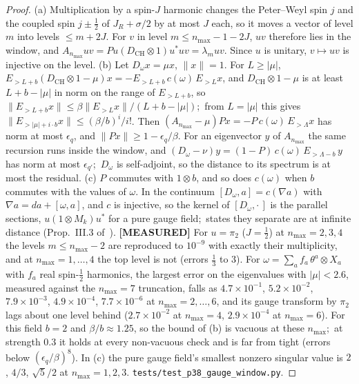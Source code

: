 \documentclass[11pt,a4paper]{article}
\theoremstyle{plain}
\theoremstyle{definition}
\newcommand{\nmax}{n_{\max}}
\newcommand{\norm}[1]{\lVert #1 \rVert}
\newcommand{\DCH}{D_{\mathrm{CH}}}
\begin{document}
\begin{proof}
(a) Multiplication by a spin-$J$ harmonic changes the Peter--Weyl spin
$j$ and the coupled spin $j \pm \tfrac12$ of $J_R + \sigma/2$ by at most
$J$ each, so it moves a vector of level $m$ into levels $\le m + 2J$.
For $v$ in level $m \le \nmax - 1 - 2J$, $uv$ therefore lies in the
window, and $A_{\nmax} uv = P u (\DCH \otimes 1) u^* u v = \lambda_m
uv$. Since $u$ is unitary, $v \mapsto uv$ is injective on the level.
(b) Let $D_\omega x = \mu x$, $\norm{x} = 1$. For $L \ge |\mu|$,
$E_{>L+b}(\DCH \otimes 1 - \mu) x = -E_{>L+b}\, c(\omega)\, E_{>L} x$,
and $\DCH \otimes 1 - \mu$ is at least $L + b - |\mu|$ in norm on the
range of $E_{>L+b}$, so $\norm{E_{>L+b} x} \le \beta \norm{E_{>L} x}/
(L + b - |\mu|)$;\ from $L = |\mu|$ this gives $\norm{E_{>|\mu| + i \cdot b}
x} \le (\beta/b)^i/i!$. Then $(A_{\nmax} - \mu) P x = -P\, c(\omega)\,
E_{>\Lambda} x$ has norm at most $\epsilon_q$, and $\norm{Px} \ge 1 -
\epsilon_q/\beta$. For an eigenvector $y$ of $A_{\nmax}$ the same
recursion runs inside the window, and $(D_\omega - \nu) y = (1 - P)\,
c(\omega)\, E_{>\Lambda - b}\, y$ has norm at most $\epsilon_{q'}$;\
$D_\omega$ is self-adjoint, so the distance to its spectrum is at most
the residual. (c) $P$ commutes with $1 \otimes b$, and so does
$c(\omega)$ when $b$ commutes with the values of $\omega$. In the
continuum $[D_\omega, a] = c(\nabla a)$ with $\nabla a = da + [\omega,
a]$, and $c$ is injective, so the kernel of $[D_\omega, \cdot\,]$ is the
parallel sections, $u (1 \otimes M_k) u^*$ for a pure gauge field;\
states they separate are at infinite distance (Prop.~III.3
of~\cite{martinetti2006}). \textbf{[MEASURED]} For $u = \pi_2$ ($J = \tfrac12$)
at $\nmax = 2, 3, 4$ the levels $m \le \nmax - 2$ are reproduced to
$10^{-9}$ with exactly their multiplicity, and at $\nmax = 1, \dots, 4$
the top level is not (errors $\tfrac13$ to $3$). For $\omega = \sum_a f_a\, \theta^a \otimes
X_a$ with $f_a$ real spin-$\tfrac12$ harmonics, the largest error on
the eigenvalues with $|\mu| < 2.6$, measured against the $\nmax = 7$
truncation, falls as $4.7 \times 10^{-1}$,
$5.2 \times 10^{-2}$, $7.9 \times 10^{-3}$, $4.9 \times 10^{-4}$, $7.7
\times 10^{-6}$ at $\nmax = 2, \dots, 6$, and its gauge transform by
$\pi_2$ lags about one level behind ($2.7 \times 10^{-2}$ at $\nmax =
4$, $2.9 \times 10^{-4}$ at $\nmax = 6$). For this field $b = 2$ and
$\beta/b \approx 1.25$, so the bound of (b) is vacuous at these
$\nmax$;\ at strength $0.3$ it holds at every non-vacuous check and is
far from tight (errors below $(\epsilon_q/\beta)^8$). In (c) the pure gauge field's smallest
nonzero singular value is $2$, $4/3$, $\sqrt5/2$ at $\nmax = 1, 2, 3$.
\texttt{tests/test\_p38\_gauge\_window.py}.
\end{proof}
\end{document}
